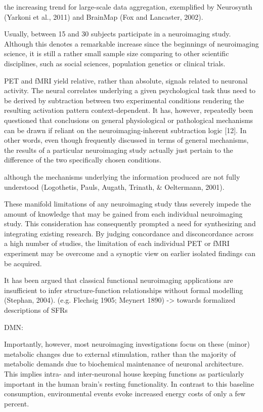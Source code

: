 \documentclass[authoryear,review,3p]{elsarticle}
\begin{document}
the increasing trend for large-scale data aggregation, exemplified by Neurosynth (Yarkoni et al., 2011) and BrainMap (Fox and Lancaster, 2002).


Usually, between 15 and 30 subjects participate in a neuroimaging study. Although this denotes a remarkable increase since the beginnings of neuroimaging science, it is still a rather small sample size comparing to other scientific disciplines, such as social sciences, population genetics or clinical trials.

PET and fMRI yield relative, rather than absolute, signals related to neuronal activity. The neural correlates underlying a given psychological task thus need to be derived by subtraction between two experimental conditions rendering the resulting activation pattern context-dependent. It has, however, repeatedly been questioned that conclusions on general physiological or pathological mechanisms can be drawn if reliant on the neuroimaging-inherent subtraction logic [12]. In other words, even though frequently discussed in terms of general mechanisms, the results of a particular neuroimaging study actually just pertain to the difference of the two specifically chosen conditions.

although the mechanisms underlying the information produced are not fully understood (Logothetis, Pauls, Augath, Trinath, & Oeltermann, 2001).

These manifold limitations of any neuroimaging study thus severely impede the amount of knowledge that may be gained from each individual neuroimaging study. This consideration has consequently prompted a need for synthesizing and integrating existing research. By judging concordance and disconcordance across a high number of studies, the limitation of each individual PET or fMRI experiment may be overcome and a synoptic view on earlier isolated findings can be acquired.











It has been argued that classical functional neuroimaging applications
are insufficient to infer structure-function relationships
without formal modelling (Stephan, 2004).
(e.g. Flechsig 1905; Meynert 1890)
-> towards formalized descriptions of SFRs


DMN:

Importantly, however, most neuroimaging investigations focus on these (minor) metabolic changes due to external stimulation, rather than the majority of metabolic demands due to biochemical maintenance of neuronal architecture.
This implies intra- and inter-neuronal house keeping functions as particularly important in the human brain's resting functionality. In contrast to this baseline consumption, environmental events evoke increased energy costs of only a few percent. 
\end{document}
